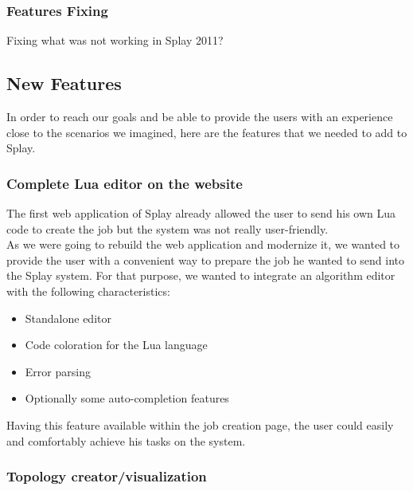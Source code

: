 \documentclass{eplmastersthesis}
\begin{document}
        \subsubsection{Features Fixing} %

          Fixing what was not working in Splay 2011?

      \subsection{New Features}

        In order to reach our goals and be able to provide the users with
        an experience close to the scenarios we imagined, here are the
        features that we needed to add to Splay.

        \subsubsection{Complete Lua editor on the website}

          The first web application of Splay already allowed the user to send
          his own Lua code to create the job but the system was not really
          user-friendly.\\

          As we were going to rebuild the web application and modernize it,
          we wanted to provide the user with a convenient way to prepare
          the job he wanted to send into the Splay system. For that purpose,
          we wanted to integrate an algorithm editor with the following
          characteristics:

          \begin{itemize}
            \item Standalone editor
            \item Code coloration for the Lua language
            \item Error parsing
            \item Optionally some auto-completion features
          \end{itemize}

          Having this feature available within the job creation page, the user
          could easily and comfortably achieve his tasks on the system.

        \subsubsection{Topology creator/visualization}
\end{document}
